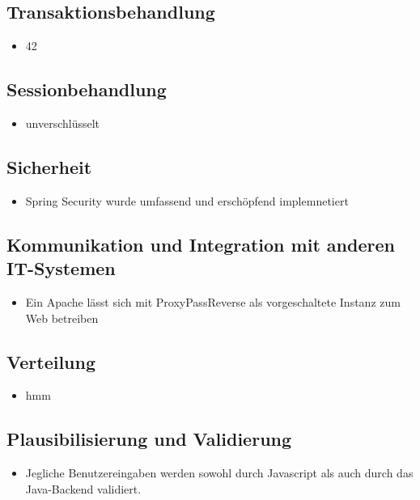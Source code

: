 \documentclass[a4paper]{article}
\begin{document}
\subsection{Transaktionsbehandlung}

\begin{itemize}
	\item 42
\end{itemize}

\subsection{Sessionbehandlung}

\begin{itemize}
	\item unverschlüsselt
\end{itemize}

\subsection{Sicherheit}

\begin{itemize}
	\item Spring Security wurde umfassend und erschöpfend implemnetiert
\end{itemize}

\subsection{Kommunikation und Integration mit anderen IT-Systemen}

\begin{itemize}
	\item Ein Apache lässt sich mit ProxyPassReverse als vorgeschaltete Instanz zum Web betreiben
\end{itemize}

\subsection{Verteilung}

\begin{itemize}
	\item hmm
\end{itemize}

\subsection{Plausibilisierung und Validierung}

\begin{itemize}
	\item Jegliche Benutzereingaben werden sowohl durch Javascript als auch durch das Java-Backend validiert.
\end{itemize}
\end{document}
